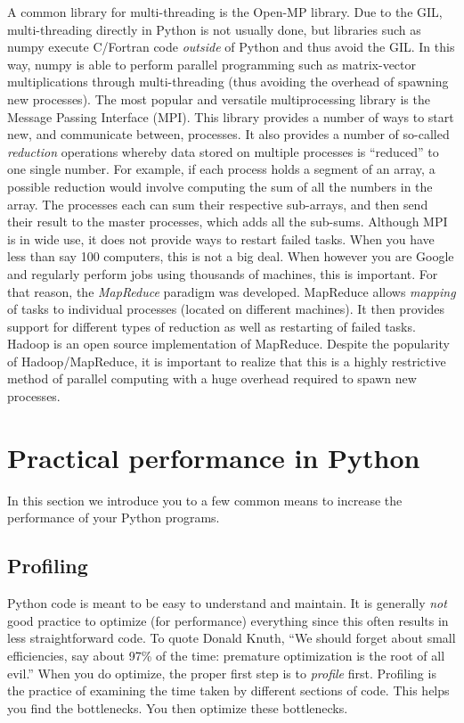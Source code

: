 A common library for multi-threading is the Open-MP library.  Due to the GIL, multi-threading directly in Python is not usually done, but libraries such as numpy execute C/Fortran code \emph{outside} of Python and thus avoid the GIL.  In this way, numpy is able to perform parallel programming such as matrix-vector multiplications through multi-threading (thus avoiding the overhead of spawning new processes).  The most popular and versatile multiprocessing library is the Message Passing Interface (MPI).  This library provides a number of ways to start new, and communicate between, processes.  It also provides a number of so-called \emph{reduction} operations whereby data stored on multiple processes is ``reduced'' to one single number.  For example, if each process holds a segment of an array, a possible reduction would involve computing the sum of all the numbers in the array.  The processes each can sum their respective sub-arrays, and then send their result to the master processes, which adds all the sub-sums.  Although MPI is in wide use, it does not provide ways to restart failed tasks.  When you have less than say 100 computers, this is not a big deal.  When however you are Google and regularly perform jobs using thousands of machines, this is important.  For that reason, the \emph{MapReduce} paradigm was developed.  MapReduce allows \emph{mapping} of tasks to individual processes (located on different machines).  It then provides support for different types of reduction as well as restarting of failed tasks.  Hadoop is an open source implementation of MapReduce.  Despite the popularity of Hadoop/MapReduce, it is important to realize that this is a highly restrictive method of parallel computing with a huge overhead required to spawn new processes.

\section{Practical performance in Python}

In this section we introduce you to a few common means to increase the performance of your Python programs.

\subsection{Profiling}

Python code is meant to be easy to understand and maintain.  It is generally \emph{not} good practice to optimize (for performance) everything since this often results in less straightforward code.  To quote Donald Knuth, ``We should forget about small efficiencies, say about 97\% of the time: premature optimization is the root of all evil.''  When you do optimize, the proper first step is to \emph{profile} first.  Profiling is the practice of examining the time taken by different sections of code.  This helps you find the bottlenecks.  You then optimize these bottlenecks.

